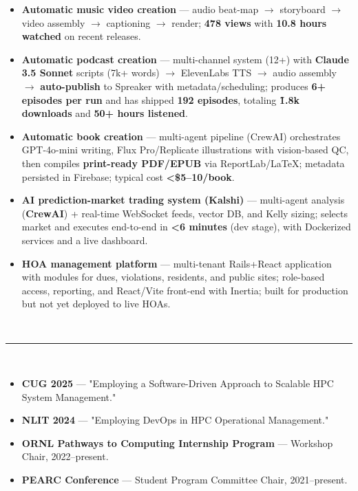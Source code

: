 \documentclass[11pt,a4paper]{article}
\newcommand{\resumesection}[1]{
    \vspace{3pt}                                    %
    \noindent{\fontsize{13}{15}\selectfont\textbf{#1}}\\[-8pt]                    %
    \noindent\textcolor{gray}{\rule{\textwidth}{2pt}}\\[-10pt]  %
}
\newcommand{\regbullet}[1]{
    \item {\fontsize{10}{12}\selectfont #1}
}
\begin{document}
\begin{itemize}[leftmargin=18pt,itemsep=1pt,topsep=0pt]
\regbullet{\textbf{Automatic music video creation} — audio beat-map $\rightarrow$ storyboard $\rightarrow$ video assembly $\rightarrow$ captioning $\rightarrow$ render; \textbf{478 views} with \textbf{10.8 hours watched} on recent releases.}

\regbullet{\textbf{Automatic podcast creation} — multi-channel system (12+) with \textbf{Claude 3.5 Sonnet} scripts (7k+ words) $\rightarrow$ ElevenLabs TTS $\rightarrow$ audio assembly $\rightarrow$ \textbf{auto-publish} to Spreaker with metadata/scheduling; produces \textbf{6+ episodes per run} and has shipped \textbf{192 episodes}, totaling \textbf{\~1.8k downloads} and \textbf{50+ hours listened}.}

\regbullet{\textbf{Automatic book creation} — multi-agent pipeline (CrewAI) orchestrates GPT-4o-mini writing, Flux Pro/Replicate illustrations with vision-based QC, then compiles \textbf{print-ready PDF/EPUB} via ReportLab/LaTeX; metadata persisted in Firebase; typical cost \textbf{<\$5--10/book}.}

\regbullet{\textbf{AI prediction-market trading system (Kalshi)} — multi-agent analysis (\textbf{CrewAI}) + real-time WebSocket feeds, vector DB, and Kelly sizing; selects market and executes end-to-end in \textbf{<6 minutes} (dev stage), with Dockerized services and a live dashboard.}

\regbullet{\textbf{HOA management platform} — multi-tenant Rails+React application with modules for dues, violations, residents, and public sites; role-based access, reporting, and React/Vite front-end with Inertia; built for production but not yet deployed to live HOAs.}
\end{itemize}


\resumesection{TALKS \& COMMUNITY}

\begin{itemize}[leftmargin=18pt,itemsep=1pt,topsep=0pt]
\regbullet{\textbf{CUG 2025} — "Employing a Software-Driven Approach to Scalable HPC System Management."}

\regbullet{\textbf{NLIT 2024} — "Employing DevOps in HPC Operational Management."}

\regbullet{\textbf{ORNL Pathways to Computing Internship Program} — Workshop Chair, 2022--present.}

\regbullet{\textbf{PEARC Conference} — Student Program Committee Chair, 2021--present.}
\end{itemize}

\end{document}
